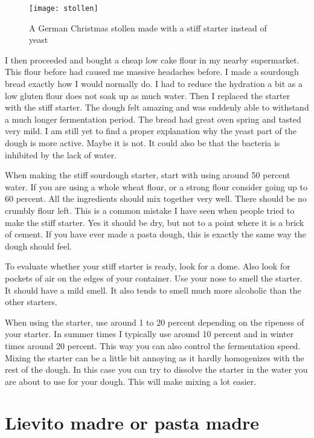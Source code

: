 \begin{figure}[!htb]
  \texttt{[image: stollen]}
  \caption{A German Christmas stollen made with a stiff starter instead of yeast}
  \label{fig:stollen}
\end{figure}

I then proceeded and bought a cheap low cake flour in my nearby supermarket.
This flour before had caused me massive headaches before. I made a sourdough bread
exactly how I would normally do. I had to reduce the hydration a bit as a low
gluten flour does not soak up as much water. Then I replaced the starter with
the stiff starter. The dough felt amazing and was suddenly able to withstand a
much longer fermentation period. The bread had great oven spring and tasted
very mild. I am still yet to find a proper explanation why the yeast part of
the dough is more active. Maybe it is not. It could also be that the bacteria
is inhibited by the lack of water.

When making the stiff sourdough starter, start with using around 50 percent
water. If you are using a whole wheat flour, or a strong flour consider going
up to 60 percent. All the ingredients should mix together very well. There
should be no crumbly flour left. This is a common mistake I have seen when
people tried to make the stiff starter. Yes it should be dry, but not to a
point where it is a brick of cement. If you have ever made a pasta dough, this is
exactly the same way the dough should feel.

To evaluate whether your stiff starter is ready, look for a dome. Also look for
pockets of air on the edges of your container. Use your nose to smell the
starter. It should have a mild smell. It also tends to smell much more
alcoholic than the other starters.

When using the starter, use around 1 to 20 percent depending on the ripeness of
your starter. In summer times I typically use around 10 percent and in winter
times around 20 percent. This way you can also control the fermentation speed.
Mixing the starter can be a little bit annoying as it hardly homogenizes with
the rest of the dough. In this case you can try to dissolve the starter in the
water you are about to use for your dough. This will make mixing a lot easier.


\section{Lievito madre or pasta madre}

